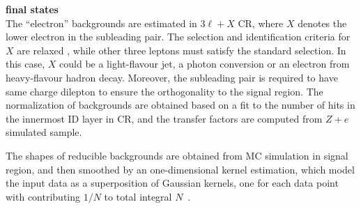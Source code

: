 \textbf{\llee final states} \\
The ``electron'' backgrounds are estimated in $3\ell+X$ CR, where $X$ denotes the lower \pt electron in the subleading pair.
The selection and identification criteria for $X$ are relaxed , while other three leptons must satisfy the standard selection.
In this case, $X$ could be a light-flavour jet, a photon conversion or an electron from heavy-flavour hadron decay.
Moreover, the subleading pair is required to have same charge dilepton to ensure the orthogonality to the signal region.
The normalization of backgrounds are obtained based on a fit to the number of hits in the innermost ID layer in CR,
and the transfer factors are computed from $Z+e$ simulated sample.

The \mfl shapes of reducible backgrounds are obtained from MC simulation in signal region, and then smoothed by an one-dimensional kernel estimation,
which model the input data as a superposition of Gaussian kernels, one for each data point with contributing $1/N$ to total integral $N$~\cite{Cranmer:2000du}.
